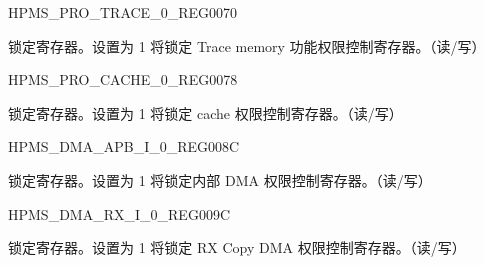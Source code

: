 \begin{register}{H}{PMS\_PRO\_TRACE\_0\_REG}{\hexprefix{}0070}\label{regdesc:PMSPROTRACE0REG}
%
%
\regnewline%
\begin{regdesc}\begin{reglist}
\label{fielddesc:PMSPROTRACELOCK}\item [PMS\_PRO\_TRACE\_LOCK] 锁定寄存器。设置为 1 将锁定 Trace memory 功能权限控制寄存器。（读/写）
\end{reglist}\end{regdesc}
\end{register}


\begin{register}{H}{PMS\_PRO\_CACHE\_0\_REG}{\hexprefix{}0078}\label{regdesc:PMSPROCACHE0REG}
%
%
\regnewline%
\begin{regdesc}\begin{reglist}
\label{fielddesc:PMSPROCACHELOCK}\item [PMS\_PRO\_CACHE\_LOCK] 锁定寄存器。设置为 1 将锁定 cache 权限控制寄存器。（读/写）
\end{reglist}\end{regdesc}
\end{register}


\begin{register}{H}{PMS\_DMA\_APB\_I\_0\_REG}{\hexprefix{}008C}\label{regdesc:PMSDMAAPBI0REG}
%
%
\regnewline%
\begin{regdesc}\begin{reglist}
\label{fielddesc:PMSDMAAPBILOCK}\item [PMS\_DMA\_APB\_I\_LOCK] 锁定寄存器。设置为 1 将锁定内部 DMA 权限控制寄存器。（读/写）
\end{reglist}\end{regdesc}
\end{register}


\begin{register}{H}{PMS\_DMA\_RX\_I\_0\_REG}{\hexprefix{}009C}\label{regdesc:PMSDMARXI0REG}
%
%
\regnewline%
\begin{regdesc}\begin{reglist}
\label{fielddesc:PMSDMARXILOCK}\item [PMS\_DMA\_RX\_I\_LOCK] 锁定寄存器。设置为 1 将锁定 RX Copy DMA 权限控制寄存器。（读/写）
\end{reglist}\end{regdesc}
\end{register}


